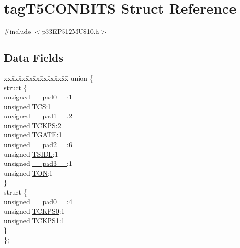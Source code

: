 \hypertarget{structtag_t5_c_o_n_b_i_t_s}{}\section{tag\+T5\+C\+O\+N\+B\+I\+TS Struct Reference}
\label{structtag_t5_c_o_n_b_i_t_s}


{\ttfamily \#include $<$p33\+E\+P512\+M\+U810.\+h$>$}

\subsection*{Data Fields}
\begin{DoxyCompactItemize}
\item 
\begin{tabbing}
xx\=xx\=xx\=xx\=xx\=xx\=xx\=xx\=xx\=\kill
union \{\\
\>struct \{\\
\>\>unsigned \hyperlink{structtag_t5_c_o_n_b_i_t_s_adf71f3d8410c1f1dbbc96680a92c49af}{\_\_pad0\_\_}:1\\
\>\>unsigned \hyperlink{structtag_t5_c_o_n_b_i_t_s_ab4daee3a10870ffba1c86d5020adb9b4}{TCS}:1\\
\>\>unsigned \hyperlink{structtag_t5_c_o_n_b_i_t_s_acaf2d0924a107ec6e8d2e31febaf66f9}{\_\_pad1\_\_}:2\\
\>\>unsigned \hyperlink{structtag_t5_c_o_n_b_i_t_s_a0d455d68434019feaabe9dfb64d75552}{TCKPS}:2\\
\>\>unsigned \hyperlink{structtag_t5_c_o_n_b_i_t_s_a35b6e4b591a8bd20e026168399eb0e6a}{TGATE}:1\\
\>\>unsigned \hyperlink{structtag_t5_c_o_n_b_i_t_s_a4d97cc5f7d51d22fc2bf3eab35c9cb7f}{\_\_pad2\_\_}:6\\
\>\>unsigned \hyperlink{structtag_t5_c_o_n_b_i_t_s_a4971b881615ef42703b5b78179fcda3d}{TSIDL}:1\\
\>\>unsigned \hyperlink{structtag_t5_c_o_n_b_i_t_s_ad7d7cee33e0c7f447abc4d171c628dd4}{\_\_pad3\_\_}:1\\
\>\>unsigned \hyperlink{structtag_t5_c_o_n_b_i_t_s_a8c2a094047d1019ce1c5b25ea8cff9b3}{TON}:1\\
\>\} \\
\>struct \{\\
\>\>unsigned \hyperlink{structtag_t5_c_o_n_b_i_t_s_adf71f3d8410c1f1dbbc96680a92c49af}{\_\_pad0\_\_}:4\\
\>\>unsigned \hyperlink{structtag_t5_c_o_n_b_i_t_s_a5cd4ef74604f5d88289a53f41cf38b7e}{TCKPS0}:1\\
\>\>unsigned \hyperlink{structtag_t5_c_o_n_b_i_t_s_ae190f2375c403c9fe8f5eb62a5bdf200}{TCKPS1}:1\\
\>\} \\
\}; \\

\end{tabbing}\end{DoxyCompactItemize}


